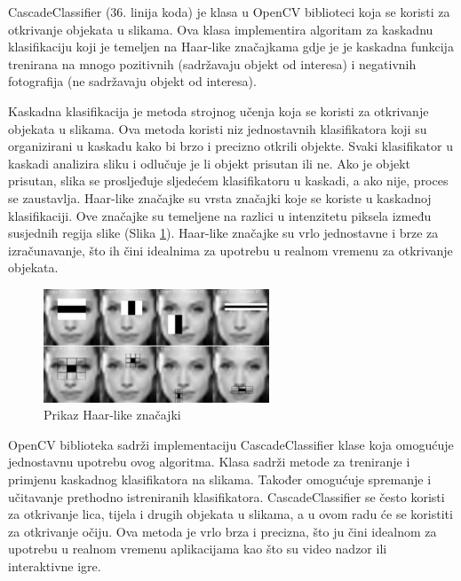 \documentclass{foi}
\begin{document}
CascadeClassifier (36. linija koda) je klasa u OpenCV biblioteci koja se koristi za otkrivanje objekata u slikama. Ova klasa implementira algoritam za kaskadnu klasifikaciju koji je temeljen na Haar-like značajkama gdje je je kaskadna funkcija trenirana na mnogo pozitivnih (sadržavaju objekt od interesa) i negativnih fotografija (ne sadržavaju objekt od interesa). \cite{OpenCV5}

Kaskadna klasifikacija je metoda strojnog učenja koja se koristi za otkrivanje objekata u slikama. Ova metoda koristi niz jednostavnih klasifikatora koji su organizirani u kaskadu kako bi brzo i precizno otkrili objekte. Svaki klasifikator u kaskadi analizira sliku i odlučuje je li objekt prisutan ili ne. Ako je objekt prisutan, slika se prosljeđuje sljedećem klasifikatoru u kaskadi, a ako nije, proces se zaustavlja. Haar-like značajke su vrsta značajki koje se koriste u kaskadnoj klasifikaciji. Ove značajke su temeljene na razlici u intenzitetu piksela između susjednih regija slike (Slika \ref{fig:haar_casc}). Haar-like značajke su vrlo jednostavne i brze za izračunavanje, što ih čini idealnima za upotrebu u realnom vremenu za otkrivanje objekata. \cite{KhanTanw2019}

\begin{figure}[h!]
    \centering
    \includegraphics[width=0.6\textwidth]{slike/haar_cascade}
    \caption{Prikaz Haar-like značajki \cite{OpenCV-haar}}
    \label{fig:haar_casc}
\end{figure}

\newpage
OpenCV biblioteka sadrži implementaciju CascadeClassifier klase koja omogućuje jednostavnu upotrebu ovog algoritma. Klasa sadrži metode za treniranje i primjenu kaskadnog klasifikatora na slikama. Također omogućuje spremanje i učitavanje prethodno istreniranih klasifikatora. CascadeClassifier se često koristi za otkrivanje lica, tijela i drugih objekata u slikama, a u ovom radu će se koristiti za otkrivanje očiju. Ova metoda je vrlo brza i precizna, što ju čini idealnom za upotrebu u realnom vremenu aplikacijama kao što su video nadzor ili interaktivne igre. \cite{OpenCV5}
\end{document}

